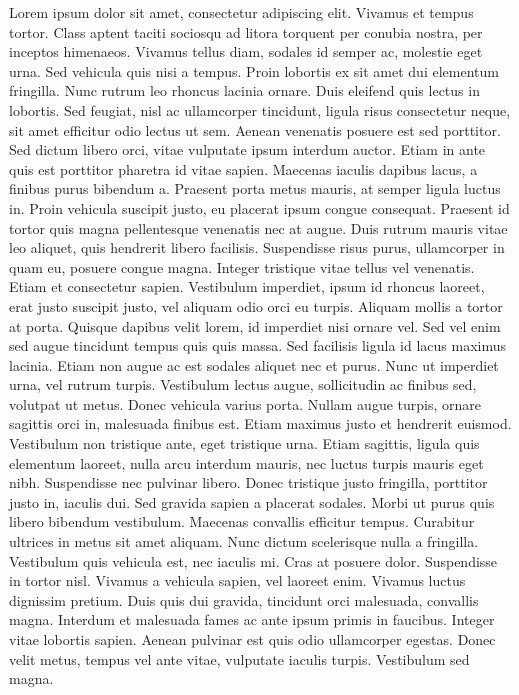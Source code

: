 \documentclass[10pt]{letter}
\begin{document}
\begin{letter}{}
Lorem ipsum dolor sit amet, consectetur adipiscing elit. Vivamus et tempus tortor. Class aptent taciti sociosqu ad litora torquent per conubia nostra, per inceptos himenaeos. Vivamus tellus diam, sodales id semper ac, molestie eget urna. Sed vehicula quis nisi a tempus. Proin lobortis ex sit amet dui elementum fringilla. Nunc rutrum leo rhoncus lacinia ornare. Duis eleifend quis lectus in lobortis. Sed feugiat, nisl ac ullamcorper tincidunt, ligula risus consectetur neque, sit amet efficitur odio lectus ut sem.
\vspace{0.5em}
Aenean venenatis posuere est sed porttitor. Sed dictum libero orci, vitae vulputate ipsum interdum auctor. Etiam in ante quis est porttitor pharetra id vitae sapien. Maecenas iaculis dapibus lacus, a finibus purus bibendum a. Praesent porta metus mauris, at semper ligula luctus in. Proin vehicula suscipit justo, eu placerat ipsum congue consequat. Praesent id tortor quis magna pellentesque venenatis nec at augue. Duis rutrum mauris vitae leo aliquet, quis hendrerit libero facilisis. Suspendisse risus purus, ullamcorper in quam eu, posuere congue magna. Integer tristique vitae tellus vel venenatis. Etiam et consectetur sapien. Vestibulum imperdiet, ipsum id rhoncus laoreet, erat justo suscipit justo, vel aliquam odio orci eu turpis.
\vspace{0.5em}
Aliquam mollis a tortor at porta. Quisque dapibus velit lorem, id imperdiet nisi ornare vel. Sed vel enim sed augue tincidunt tempus quis quis massa. Sed facilisis ligula id lacus maximus lacinia. Etiam non augue ac est sodales aliquet nec et purus. Nunc ut imperdiet urna, vel rutrum turpis. Vestibulum lectus augue, sollicitudin ac finibus sed, volutpat ut metus. Donec vehicula varius porta.
\vspace{0.5em}
Nullam augue turpis, ornare sagittis orci in, malesuada finibus est. Etiam maximus justo et hendrerit euismod. Vestibulum non tristique ante, eget tristique urna. Etiam sagittis, ligula quis elementum laoreet, nulla arcu interdum mauris, nec luctus turpis mauris eget nibh. Suspendisse nec pulvinar libero. Donec tristique justo fringilla, porttitor justo in, iaculis dui. Sed gravida sapien a placerat sodales. Morbi ut purus quis libero bibendum vestibulum. Maecenas convallis efficitur tempus. Curabitur ultrices in metus sit amet aliquam. Nunc dictum scelerisque nulla a fringilla. Vestibulum quis vehicula est, nec iaculis mi. Cras at posuere dolor. Suspendisse in tortor nisl.
\vspace{0.5em}
Vivamus a vehicula sapien, vel laoreet enim. Vivamus luctus dignissim pretium. Duis quis dui gravida, tincidunt orci malesuada, convallis magna. Interdum et malesuada fames ac ante ipsum primis in faucibus. Integer vitae lobortis sapien. Aenean pulvinar est quis odio ullamcorper egestas. Donec velit metus, tempus vel ante vitae, vulputate iaculis turpis. Vestibulum sed magna. 


\end{letter}
\end{document}
